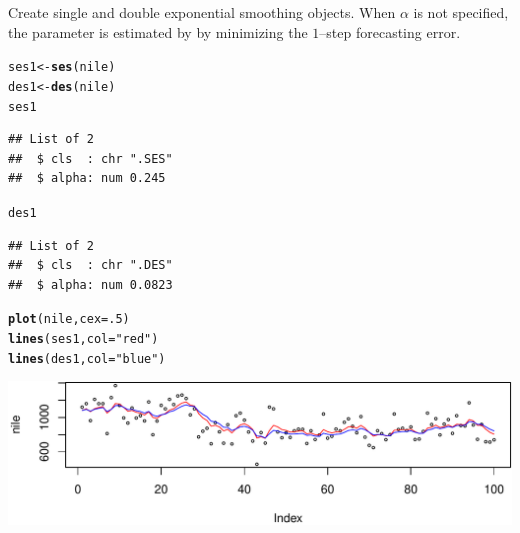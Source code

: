 \documentclass[10pt]{article}\usepackage[]{graphicx}\usepackage[]{color}
\makeatletter
\def\maxwidth{ %
  \ifdim\Gin@nat@width>\linewidth
    \linewidth
  \else
    \Gin@nat@width
  \fi
}
\newcommand{\hlnum}[1]{\textcolor[rgb]{0.686,0.059,0.569}{#1}}%
\newcommand{\hlstr}[1]{\textcolor[rgb]{0.192,0.494,0.8}{#1}}%
\newcommand{\hlstd}[1]{\textcolor[rgb]{0.345,0.345,0.345}{#1}}%
\newcommand{\hlkwb}[1]{\textcolor[rgb]{0.69,0.353,0.396}{#1}}%
\newcommand{\hlkwc}[1]{\textcolor[rgb]{0.333,0.667,0.333}{#1}}%
\newcommand{\hlkwd}[1]{\textcolor[rgb]{0.737,0.353,0.396}{\textbf{#1}}}%
\newenvironment{kframe}{%
 \def\at@end@of@kframe{}%
 \ifinner\ifhmode%
  \def\at@end@of@kframe{\end{minipage}}%
  \begin{minipage}{\columnwidth}%
 \fi\fi%
 \def\FrameCommand##1{\hskip\@totalleftmargin \hskip-\fboxsep
 \colorbox{shadecolor}{##1}\hskip-\fboxsep
     \hskip-\linewidth \hskip-\@totalleftmargin \hskip\columnwidth}%
 \MakeFramed {\advance\hsize-\width
   \@totalleftmargin\z@ \linewidth\hsize
   \@setminipage}}%
 {\par\unskip\endMakeFramed%
 \at@end@of@kframe}
\newenvironment{knitrout}{}{} %
\makeatother
\begin{document}
Create single and double exponential smoothing objects. When $\alpha$
is not specified, the parameter is estimated by by minimizing the
$1$--step forecasting error.
\begin{knitrout}
\color{fgcolor}\begin{kframe}
\begin{alltt}
\hlstd{ses1} \hlkwb{<-} \hlkwd{ses}\hlstd{(nile)}
\hlstd{des1} \hlkwb{<-} \hlkwd{des}\hlstd{(nile)}
\hlstd{ses1}
\end{alltt}
\begin{verbatim}
## List of 2
##  $ cls  : chr ".SES"
##  $ alpha: num 0.245
\end{verbatim}
\begin{alltt}
\hlstd{des1}
\end{alltt}
\begin{verbatim}
## List of 2
##  $ cls  : chr ".DES"
##  $ alpha: num 0.0823
\end{verbatim}
\end{kframe}
\end{knitrout}

\begin{knitrout}
\color{fgcolor}\begin{kframe}
\begin{alltt}
\hlkwd{plot}\hlstd{(nile,} \hlkwc{cex}\hlstd{=}\hlnum{.5}\hlstd{)}
\hlkwd{lines}\hlstd{(ses1,} \hlkwc{col}\hlstd{=}\hlstr{"red"}\hlstd{)}
\hlkwd{lines}\hlstd{(des1,} \hlkwc{col}\hlstd{=}\hlstr{"blue"}\hlstd{)}
\end{alltt}
\end{kframe}
\includegraphics[width=\maxwidth]{fig/graphunnamed-chunk-6-1} 

\end{knitrout}
\end{document}
